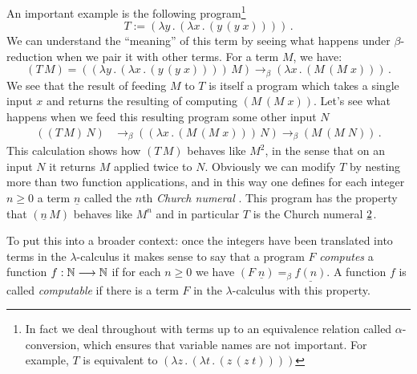 \documentclass[english,letter paper,12pt,reqno]{article}
\theoremstyle{example}
\numberwithin{equation}{section}
\begin{document}
An important example is the following program\footnote{In fact we deal throughout with terms up to an equivalence relation called $\alpha$-conversion, which ensures that variable names are not important. For example, $T$ is equivalent to $( \lambda z \,.\, ( \lambda t \,.\, (z \,(z \; t))))$}
\[
T := ( \lambda y \,.\, ( \lambda x \,.\, (y \,(y \; x))))\,.
\]
We can understand the ``meaning'' of this term by seeing what happens under $\beta$-reduction when we pair it with other terms. For a term $M$, we have:
\begin{equation}\label{eq:beta_reduc_dup}
(T \, M) = (( \lambda y \,.\, ( \lambda x \,.\, (y \,(y \; x))))\, M) \longrightarrow_\beta (\lambda x \, . \, (M \, (M \; x)))\,.
\end{equation}
We see that the result of feeding $M$ to $T$ is itself a program which takes a single input $x$ and returns the resulting of computing $(M \, (M \; x))$. Let's see what happens when we feed this resulting program some other input $N$
\begin{align*}
((T \, M) \, N) &\longrightarrow_\beta ((\lambda x \, . \, (M \, (M \; x))) \, N) \longrightarrow_\beta (M \, (M \; N))\,.
\end{align*}
This calculation shows how $(T \, M)$ behaves like $M^2$, in the sense that on an input $N$ it returns $M$ applied twice to $N$. Obviously we can modify $T$ by nesting more than two function applications, and in this way one defines for each integer $n \ge 0$ a term $\underline{n}$ called the $n$th \emph{Church numeral} \cite[\S 3.2]{selinger}. This program has the property that $(\underline{n} \, M)$ behaves like $M^n$ and in particular $T$ is the Church numeral $\underline{2}$.

To put this into a broader context: once the integers have been translated into terms in the $\lambda$-calculus it makes sense to say that a program $F$ \emph{computes} a function $f: \mathbb{N} \longrightarrow \mathbb{N}$ if for each $n \ge 0$ we have $(F \; \underline{n}) =_\beta \underline{f(n)}$. A function $f$ is called \emph{computable} if there is a term $F$ in the $\lambda$-calculus with this property.
\\
\end{document}

